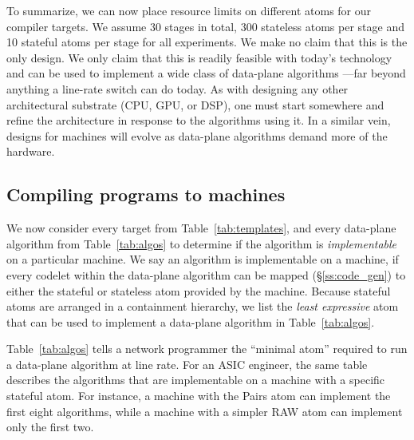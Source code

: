 To summarize, we can now place resource limits on different atoms for our
compiler targets. We assume 30 stages in total, 300 stateless atoms per stage
and 10 stateful atoms per stage for all experiments. We make no claim that this
is the only design. We only claim that this is readily feasible with today's
technology and can be used to implement a wide class of data-plane algorithms
---far beyond anything a line-rate switch can do today. As with designing any
other architectural substrate (CPU, GPU, or DSP), one must start somewhere and
refine the architecture in response to the algorithms using it. In a similar
vein, designs for \absmachine machines will evolve as data-plane algorithms
demand more of the hardware.


\subsection{Compiling \pktlanguage programs to \absmachine machines}

We now consider every target from Table~\ref{tab:templates}, and every
data-plane algorithm from Table~\ref{tab:algos} to determine if the algorithm
is \textit{implementable} on a particular \absmachine machine. We say an
algorithm is implementable on a \absmachine machine, if every codelet within
the data-plane algorithm can be mapped (\S\ref{ss:code_gen}) to either the
stateful or stateless atom provided by the \absmachine machine. Because
stateful atoms are arranged in a containment hierarchy, we list the
\textit{least expressive} atom that can be used to implement a data-plane
algorithm in Table~\ref{tab:algos}.

Table~\ref{tab:algos} tells a network programmer the ``minimal atom'' required
to run a data-plane algorithm at line rate. For an ASIC engineer, the same
table describes the algorithms that are implementable on a \absmachine machine
with a specific stateful atom. For instance, a \absmachine machine with the
Pairs atom can implement the first eight algorithms, while a machine with a
simpler RAW atom can implement only the first two.

